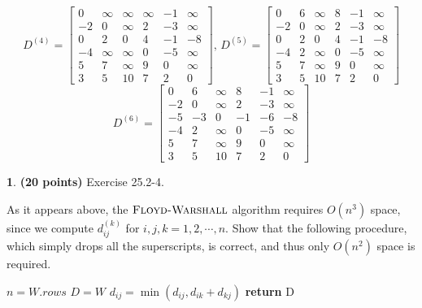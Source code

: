 \documentclass[11pt]{article}
\theoremstyle{definition}
\theoremstyle{theorem}
\newtheorem{prob}{}
\begin{document}
\[
D^{(4)} = 
\begin{bmatrix}
0 	& \infty 	& \infty 	& \infty 	& -1		& \infty 	\\
-2 	& 0	       	& \infty	& 2		& -3		& \infty 	\\
0	& 2		& 0 		& 4		& -1		& -8  	\\
-4	& \infty	& \infty	& 0		& -5		& \infty 	\\
5	& 7		& \infty	& 9		& 0		& \infty 	\\
3	& 5		& 10		& 7		& 2		& 0
\end{bmatrix}
\text{,       } 
D^{(5)} = 
\begin{bmatrix}
0 	& 6	 	& \infty 	& 8	 	& -1		& \infty 	\\
-2 	& 0	       	& \infty	& 2		& -3		& \infty 	\\
0	& 2		& 0 		& 4		& -1		& -8  	\\
-4	& 2		& \infty	& 0		& -5		& \infty 	\\
5	& 7		& \infty	& 9		& 0		& \infty 	\\
3	& 5		& 10		& 7		& 2		& 0
\end{bmatrix}
\]
\[
D^{(6)} = 
\begin{bmatrix}
0 	& 6	 	& \infty 	& 8	 	& -1		& \infty 	\\
-2 	& 0	       	& \infty	& 2		& -3		& \infty 	\\
-5	& -3		& 0 		& -1		& -6		& -8  	\\
-4	& 2		& \infty	& 0		& -5		& \infty 	\\
5	& 7		& \infty	& 9		& 0		& \infty 	\\
3	& 5		& 10		& 7		& 2		& 0
\end{bmatrix}
\]


\newpage
\begin{prob} \textbf{(20 points)} Exercise 25.2-4.
\end{prob}

As it appears above, the $\textproc{\textsc{Floyd-Warshall}}$ algorithm requires $O(n^3)$ space, since we compute $d_{ij}^{(k)}$ for $i, j, k = 1, 2, \cdots, n$. Show that the following procedure, which simply drops all the superscripts, is correct, and thus only $O(n^2)$ space is required.

\begin{algorithmic}[1]
	\State $n = W.\textit{rows}$
	\State $D = W$
				\State $d_{ij} = \min{(d_{ij}, d_{ik} + d_{kj})}$
			\EndFor
		\EndFor
	\EndFor
	\State \textbf{return} {D}
\EndFunction
\end{algorithmic}
\end{document}

